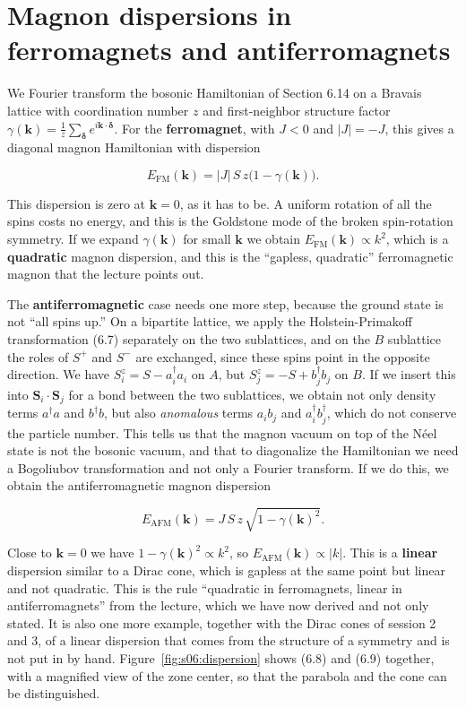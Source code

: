 \section{Magnon dispersions in ferromagnets and antiferromagnets}

We Fourier transform the bosonic Hamiltonian of Section 6.14 on a Bravais lattice with coordination
number $z$ and first-neighbor structure factor $\gamma(\mathbf k) = \tfrac1z\sum_{\boldsymbol\delta}
e^{i\mathbf k\cdot\boldsymbol\delta}$. For the \textbf{ferromagnet}, with $J<0$ and $|J|=-J$, this
gives a diagonal magnon Hamiltonian with dispersion

\begin{equation}
E_\text{FM}(\mathbf k) = |J|\,S\,z\big(1-\gamma(\mathbf k)\big).
\end{equation}

This dispersion is zero at $\mathbf k=0$, as it has to be. A uniform rotation of all the spins costs no
energy, and this is the Goldstone mode of the broken spin-rotation symmetry. If we expand
$\gamma(\mathbf k)$ for small $\mathbf k$ we obtain $E_\text{FM}(\mathbf k)\propto k^2$, which is a
\textbf{quadratic} magnon dispersion, and this is the ``gapless, quadratic'' ferromagnetic magnon that
the lecture points out.

The \textbf{antiferromagnetic} case needs one more step, because the ground state is not ``all spins
up.'' On a bipartite lattice, we apply the Holstein-Primakoff transformation (6.7) separately on the
two sublattices, and on the $B$ sublattice the roles of $S^+$ and $S^-$ are exchanged, since these
spins point in the opposite direction. We have $S_i^z=S-a_i^\dagger a_i$ on $A$, but $S_j^z=-S+b_j^\dagger b_j$ on $B$.
If we insert this into $\mathbf S_i\cdot\mathbf S_j$ for a bond between the two sublattices, we obtain
not only density terms $a^\dagger a$ and $b^\dagger b$, but also \emph{anomalous} terms
$a_i b_j$ and $a_i^\dagger b_j^\dagger$, which do not conserve the particle number. This tells us that
the magnon vacuum on top of the Néel state is not the bosonic vacuum, and that to diagonalize the
Hamiltonian we need a Bogoliubov transformation and not only a Fourier transform. If we do this, we
obtain the antiferromagnetic magnon dispersion

\begin{equation}
E_\text{AFM}(\mathbf k) = J\,S\,z\,\sqrt{1-\gamma(\mathbf k)^2}.
\end{equation}

Close to $\mathbf k=0$ we have $1-\gamma(\mathbf k)^2 \propto k^2$, so $E_\text{AFM}(\mathbf k)\propto |k|$.
This is a \textbf{linear} dispersion similar to a Dirac cone, which is gapless at the same point but
linear and not quadratic. This is the rule ``quadratic in ferromagnets, linear in antiferromagnets''
from the lecture, which we have now derived and not only stated. It is also one more example, together
with the Dirac cones of session 2 and 3, of a linear dispersion that comes from the structure of a
symmetry and is not put in by hand. Figure~\ref{fig:s06:dispersion} shows (6.8) and (6.9) together,
with a magnified view of the zone center, so that the parabola and the cone can be distinguished.

